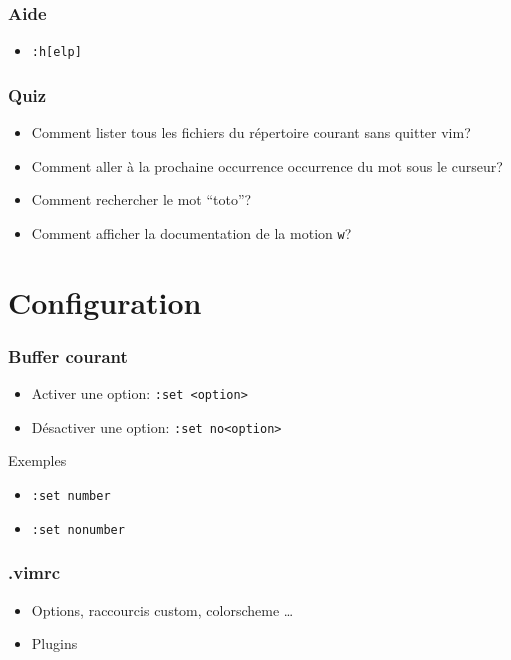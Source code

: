 \documentclass{beamer}
\begin{document}
\begin{frame} \frametitle{Aide}
  \begin{itemize}
    \item {\tt :h[elp]}
  \end{itemize}
\end{frame}
\begin{frame} \frametitle{Quiz}
  \begin{itemize}
    \item Comment lister tous les fichiers du répertoire courant sans quitter
      vim?  \pause
    \item Comment aller à la prochaine occurrence occurrence du mot sous le
      curseur? \pause {\tt *} \pause
    \item Comment rechercher le mot ``toto''?  \pause
    \item Comment afficher la documentation de la motion {\tt w}? 
  \end{itemize}
\end{frame}


\section{Configuration}
\begin{frame} \frametitle{Buffer courant}
  \begin{itemize}
    \item Activer une option: {\tt :set <option>}
    \item Désactiver une option: {\tt :set no<option>}
  \end{itemize}
  \pause
  \begin{block}{Exemples}
    \begin{itemize}
      \item {\tt :set number}
      \item {\tt :set nonumber}
    \end{itemize}
  \end{block}
\end{frame}
\begin{frame} \frametitle{.vimrc}
  \begin{itemize}
    \item Options, raccourcis custom, colorscheme \dots
    \item Plugins
  \end{itemize}
  \pause
\end{frame}
\end{document}

